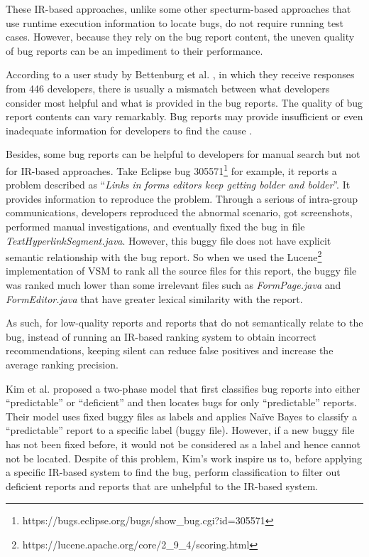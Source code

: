 These IR-based approaches, unlike some other specturm-based approaches \cite{Cleve:2005:LCP:1062455.1062522, Dit:2013:IIR:2436118.2436134, Poshyvanyk:2013:CLU:2377656.2377660, Poshyvanyk:2007:FLU:1263152.1263534, Liu:2005:SSM:1081706.1081753, Jin:2013:FFL:2483760.2483763, B.Le:2016:LBF:2931037.2931049, Le:2015:IRS:2786805.2786880, Jones:2005:EET:1101908.1101949} that use runtime execution information to locate bugs, do not require running test cases. However, because they rely on the bug report content, the uneven quality of bug reports can be an impediment to their performance.

According to a user study by Bettenburg et al. \cite{Bettenburg:2008:MGB:1453101.1453146}, in which they receive responses from 446 developers, there is usually a mismatch between what developers consider most helpful and what is provided in the bug reports. The quality of bug report contents can vary remarkably. Bug reports may provide insufficient or even inadequate information for developers to find the cause \cite{Bettenburg:2008:MGB:1453101.1453146, Kim:2013:WFT:2554428.2554437, Hooimeijer:2007:MBR:1321631.1321639}.

Besides, some bug reports can be helpful to developers for manual search but not for IR-based approaches. Take Eclipse bug 305571\footnote{https://bugs.eclipse.org/bugs/show\_bug.cgi?id=305571} for example, it reports a problem described as ``\textit{Links in forms editors keep getting bolder and bolder}''. It provides information to reproduce the problem. Through a serious of intra-group communications, developers reproduced the abnormal scenario, got screenshots, performed manual investigations, and eventually fixed the bug in file \textit{TextHyperlinkSegment.java}. However, this buggy file does not have explicit semantic relationship with the bug report. So when we used the Lucene\footnote{https://lucene.apache.org/core/2\_9\_4/scoring.html} implementation of VSM to rank all the source files for this report, the buggy file was ranked much lower than some irrelevant files such as \textit{FormPage.java} and \textit{FormEditor.java} that have greater lexical similarity with the report.

As such, for low-quality reports and reports that do not semantically relate to the bug, instead of running an IR-based ranking system to obtain incorrect recommendations, keeping silent can reduce false positives and increase the average ranking precision.

Kim et al. \cite{Kim:2013:WFT:2554428.2554437} proposed a two-phase model that first classifies bug reports into either ``predictable'' or ``deficient'' and then locates bugs for only ``predictable'' reports. Their model uses fixed buggy files as labels and applies Na\"{i}ve Bayes to classify a ``predictable'' report to a specific label (buggy file). However, if a new buggy file has not been fixed before, it would not be considered as a label and hence cannot not be located. Despite of this problem, Kim's work inspire us to, before applying a specific IR-based system to find the bug, perform classification to filter out deficient reports and reports that are unhelpful to the IR-based system.

